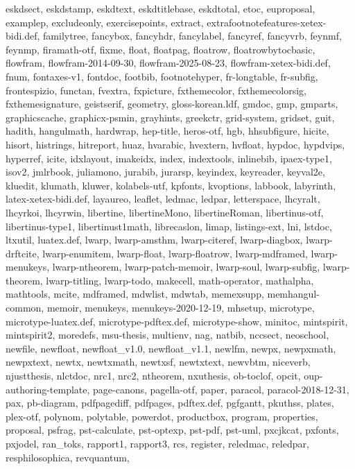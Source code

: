 \documentclass{l3in2edoc}
\begin{document}
{  eskdsect, eskdstamp, eskdtext, eskdtitlebase, eskdtotal, etoc,
  euproposal, examplep, excludeonly, exercisepoints, extract,
  extrafootnotefeatures-xetex-bidi.def, familytree, fancybox, fancyhdr,
  fancylabel, fancyref, fancyvrb, feynmf, feynmp, firamath-otf, fixme,
  float, floatpag, floatrow, floatrowbytocbasic, flowfram,
  flowfram-2014-09-30, flowfram-2025-08-23, flowfram-xetex-bidi.def,
  fnum, fontaxes-v1, fontdoc, footbib, footnotehyper, fr-longtable,
  fr-subfig, frontespizio, functan, fvextra, fxpicture, fxthemecolor,
  fxthemecolorsig, fxthemesignature, geistserif, geometry,
  gloss-korean.ldf, gmdoc, gmp, gmparts, graphicscache, graphicx-psmin,
  grayhints, greekctr, grid-system, gridset, guit, hadith, hangulmath,
  hardwrap, hep-title, heros-otf, hgb, hhsubfigure, hicite, hisort,
  histrings, hitreport, huaz, hvarabic, hvextern, hvfloat, hypdoc,
  hypdvips, hyperref, icite, idxlayout, imakeidx, index, indextools,
  inlinebib, ipaex-type1, isov2, jmlrbook, juliamono, jurabib, jurarsp,
  keyindex, keyreader, keyval2e, kluedit, klumath, kluwer, kolabels-utf,
  kpfonts, kvoptions, labbook, labyrinth, latex-xetex-bidi.def,
  layaureo, leaflet, ledmac, ledpar, letterspace, lhcyralt, lhcyrkoi,
  lhcyrwin, libertine, libertineMono, libertineRoman, libertinus-otf,
  libertinus-type1, libertinust1math, librecaslon, limap, listings-ext,
  lni, lstdoc, ltxutil, luatex.def, lwarp, lwarp-amsthm, lwarp-citeref,
  lwarp-diagbox, lwarp-drftcite, lwarp-enumitem, lwarp-float,
  lwarp-floatrow, lwarp-mdframed, lwarp-menukeys, lwarp-ntheorem,
  lwarp-patch-memoir, lwarp-soul, lwarp-subfig, lwarp-theorem,
  lwarp-titling, lwarp-todo, makecell, math-operator, mathalpha,
  mathtools, mcite, mdframed, mdwlist, mdwtab, memexsupp,
  memhangul-common, memoir, menukeys, menukeys-2020-12-19, mhsetup,
  microtype, microtype-luatex.def, microtype-pdftex.def, microtype-show,
  minitoc, mintspirit, mintspirit2, moredefs, msu-thesis, multienv, nag,
  natbib, nccsect, neoschool, newfile, newfloat, newfloat\_v1.0,
  newfloat\_v1.1, newlfm, newpx, newpxmath, newpxtext, newtx, newtxmath,
  newtxsf, newtxtext, newvbtm, niceverb, njustthesis, nlctdoc, nrc1,
  nrc2, ntheorem, nxuthesis, ob-toclof, opcit, oup-authoring-template,
  page-canons, pagella-otf, paper, paracol, paracol-2018-12-31, pax,
  pb-diagram, pdfpagediff, pdfpages, pdftex.def, pgfgantt, pkuthss,
  plates, plex-otf, polynom, polytable, powerdot, productbox, program,
  properties, proposal, psfrag, pst-calculate, pst-optexp, pst-pdf,
  pst-uml, pxcjkcat, pxfonts, pxjodel, ran\_toks, rapport1, rapport3,
  rcs, register, reledmac, reledpar, resphilosophica, revquantum,
}
\end{document}
